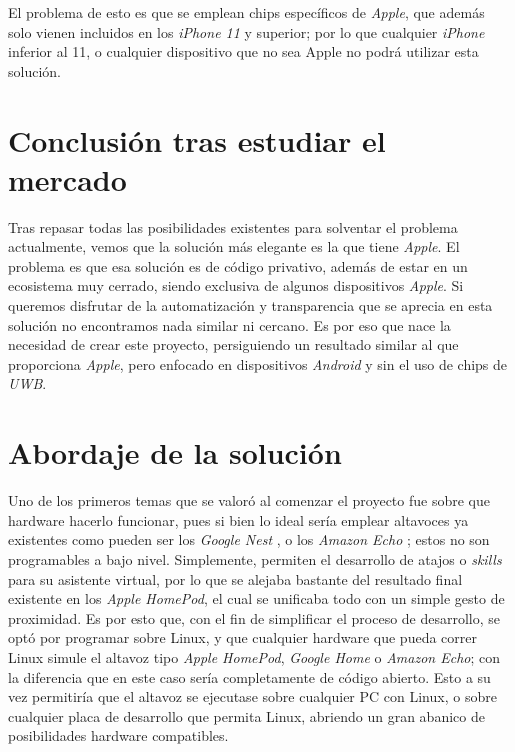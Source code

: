El problema de esto es que se emplean chips específicos de \emph{Apple}, que
además solo vienen incluidos en los \emph{iPhone 11} y superior; por lo que
cualquier \emph{iPhone} inferior al 11, o cualquier dispositivo que no sea Apple
no podrá utilizar esta solución.

\section{Conclusión tras estudiar el mercado}
Tras repasar todas las posibilidades existentes para solventar el problema
actualmente, vemos que la solución más elegante es la que tiene \emph{Apple}. El
problema es que esa solución es de código privativo, además de estar en un
ecosistema muy cerrado, siendo exclusiva de algunos dispositivos \emph{Apple}.
Si queremos disfrutar de la automatización y transparencia que se aprecia en
esta solución no encontramos nada similar ni cercano. Es por eso que nace la
necesidad de crear este proyecto, persiguiendo un resultado similar al que
proporciona \emph{Apple}, pero enfocado en dispositivos \emph{Android} y sin el
uso de chips de \emph{UWB}.\\

\section{Abordaje de la solución}

Uno de los primeros temas que se valoró al comenzar el proyecto fue sobre que
hardware hacerlo funcionar, pues si bien lo ideal sería emplear altavoces ya
existentes como pueden ser los \emph{Google Nest} \cite{google-nest}, o los
\emph{Amazon Echo} \cite{amazon-echo}; estos no son
programables a bajo nivel. Simplemente, permiten el desarrollo de atajos o
\emph{skills} para su asistente virtual, por lo que se alejaba bastante del
resultado final existente en los \emph{Apple HomePod}, el cual se unificaba todo
con un simple gesto de proximidad. Es por esto que, con el fin de simplificar el
proceso de desarrollo, se optó por programar sobre Linux, y que cualquier
hardware que pueda correr Linux simule el altavoz tipo \emph{Apple HomePod},
\emph{Google Home} o \emph{Amazon Echo}; con la diferencia que en este caso
sería completamente de código abierto. Esto a su vez permitiría que el altavoz
se ejecutase sobre cualquier PC con Linux, o sobre cualquier placa de desarrollo
que permita Linux, abriendo un gran abanico de posibilidades hardware
compatibles. 

